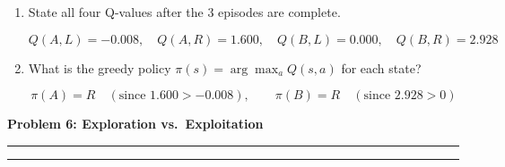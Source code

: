 \documentclass[12pt]{article}
\newcommand{\question}[1]{%
  \clearpage
  \vspace{0.5cm}
  {\noindent\normalsize \textbf{#1}}
  \vspace{0.2cm}
  \hrule
  \vspace{0.1cm}
  \hrule
  \vspace{0.3cm}
}
\begin{document}
\begin{enumerate}[label=(\alph*)]
\item State all four Q-values after the 3 episodes are complete.

\begin{resultsbox}
\[
\boxed{Q(A,L) = -0.008, \quad Q(A,R) = 1.600, \quad Q(B,L) = 0.000, \quad Q(B,R) = 2.928}
\]
\end{resultsbox}

\item What is the greedy policy $\pi(s) = \arg\max_a Q(s,a)$ for each state?

\begin{resultsbox}
\[
\boxed{\pi(A) = R \quad (\text{since } 1.600 > -0.008)}, \qquad \boxed{\pi(B) = R \quad (\text{since } 2.928 > 0)}
\]
\end{resultsbox}

\end{enumerate}


\question{Problem 6: Exploration vs.\ Exploitation}\label{prob:explore}
\end{document}
